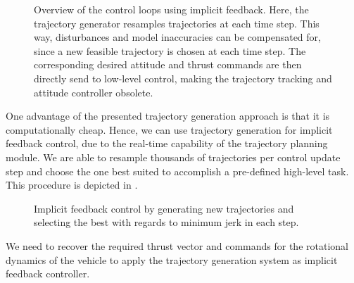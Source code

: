 \begin{figure}
	\caption{Overview of the control loops using implicit feedback. Here, the trajectory generator resamples trajectories at each time step. This way, disturbances and model inaccuracies can be compensated for, since a new feasible trajectory is chosen at each time step. The corresponding desired attitude and thrust commands are then directly send to low-level control, making the trajectory tracking and attitude controller obsolete.}
	\label{fig:control_architecture}
\end{figure}

One advantage of the presented trajectory generation approach is that it is computationally cheap. Hence, we can use trajectory generation for implicit feedback control, due to the real-time capability of the trajectory planning module. We are able to resample thousands of trajectories per control update step and choose the one best suited to accomplish a pre-defined high-level task. This procedure is depicted in . 
\begin{figure}
	\centering
    
	\caption{Implicit feedback control by generating new trajectories and selecting the best with regards to minimum jerk in each step. }
    \label{fig:implicit-resampling-example}
\end{figure}
We need to recover the required thrust vector and commands for the rotational dynamics of the vehicle to apply the trajectory generation system as implicit feedback controller.


